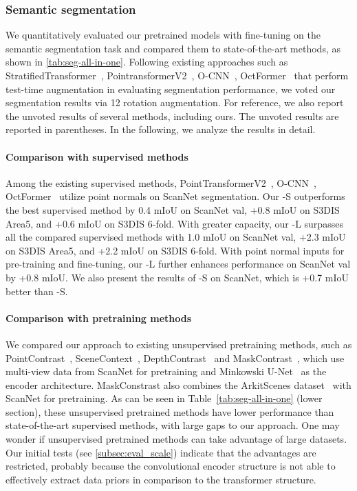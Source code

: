\documentclass[10pt,twocolumn,letterpaper]{article}
\begin{document}
\subsubsection{Semantic segmentation}\label{subsubsec:exp_segmentation}
We quantitatively evaluated our pretrained models with fine-tuning on the semantic segmentation task and compared them to state-of-the-art methods, as shown in \cref{tab:seg-all-in-one}. Following existing approaches such as StratifiedTransformer~\cite{lai2022stratified}, PointransformerV2~\cite{wu2022point}, O-CNN~\cite{Wang2017}, OctFormer~\cite{octformer} that perform test-time augmentation in evaluating segmentation performance, we voted our segmentation results via 12 rotation augmentation. For reference, we also report the unvoted results of several methods, including ours. The unvoted results are reported in parentheses.
In the following, we analyze the results in detail.

\paragraph{Comparison with supervised methods}
Among the existing supervised methods, PointTransformerV2~\cite{wu2022point}, O-CNN~\cite{Wang2017}, OctFormer~\cite{octformer} utilize point normals on ScanNet segmentation.
Our \SST-S outperforms the best supervised method by 0.4 mIoU on ScanNet val, +0.8 mIoU on S3DIS Area5, and +0.6 mIoU on S3DIS 6-fold. With greater capacity, our \SST-L surpasses all the compared supervised methods with 1.0 mIoU on ScanNet val, +2.3 mIoU on S3DIS Area5, and +2.2 mIoU on S3DIS 6-fold. With point normal inputs for pre-training and fine-tuning, our \SST-L further enhances performance on ScanNet val by +0.8 mIoU. We also present the results of \SST-S on ScanNet, which is +0.7 mIoU better than \SST-S.

\paragraph{Comparison with pretraining methods}
We compared our approach to existing unsupervised pretraining methods, such as PointContrast~\cite{Xie2020}, SceneContext~\cite{hou2020efficient},  DepthContrast~\cite{zhang2021self} and MaskContrast~\cite{wu2023masked}, which use multi-view data from ScanNet for pretraining and Minkowski U-Net~\cite{choy20194d} as the encoder architecture.  MaskConstrast also combines the ArkitScenes dataset~\cite{ARKitScenes} with ScanNet for pretraining. As can be seen in Table~\ref{tab:seg-all-in-one} (lower section), these unsupervised pretrained methods have lower performance than state-of-the-art supervised methods, with large gaps to our approach.  One may wonder if unsupervised pretrained methods can take advantage of large datasets. Our initial tests (see \cref{subsec:eval_scale}) indicate that the advantages are restricted, probably because the convolutional encoder structure is not able to effectively extract data priors in comparison to the transformer structure.
\end{document}

